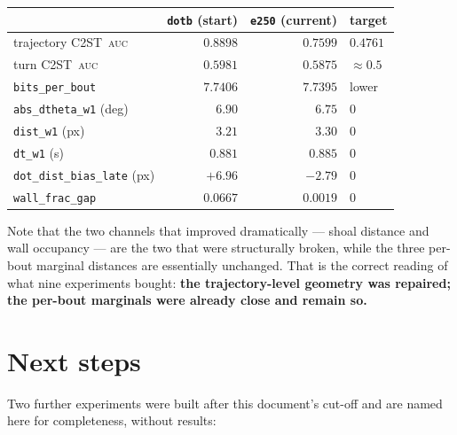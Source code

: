 \documentclass[11pt,a4paper]{article}
\newcommand{\auc}{\textsc{auc}}
\newcommand{\ctst}{C2ST}
\newcommand{\code}[1]{\texttt{\small #1}}
\begin{document}
\begin{center}\small
\begin{tabular}{lrrl}
\toprule
& \code{dotb} (start) & \code{e250} (current) & target \\
\midrule
trajectory \ctst\ \auc{} & $0.8898$ & $\mathbf{0.7599}$ & $0.4761$ \\
turn \ctst\ \auc{} & $0.5981$ & $0.5875$ & $\approx 0.5$ \\
\code{bits\_per\_bout} & $7.7406$ & $7.7395$ & lower \\
\code{abs\_dtheta\_w1} (deg) & $6.90$ & $6.75$ & $0$ \\
\code{dist\_w1} (px) & $3.21$ & $3.30$ & $0$ \\
\code{dt\_w1} (s) & $0.881$ & $0.885$ & $0$ \\
\code{dot\_dist\_bias\_late} (px) & $+6.96$ & $-2.79$ & $0$ \\
\code{wall\_frac\_gap} & $0.0667$ & $\mathbf{0.0019}$ & $0$ \\
\bottomrule
\end{tabular}
\end{center}

Note that the two channels that improved dramatically --- shoal distance and wall
occupancy --- are the two that were structurally broken, while the three per-bout marginal
distances are essentially unchanged. That is the correct reading of what nine experiments
bought: \textbf{the trajectory-level geometry was repaired; the per-bout marginals were
already close and remain so.}

\section{Next steps}\label{sec:next}

Two further experiments were built after this document's cut-off and are named here for
completeness, without results:
\end{document}
